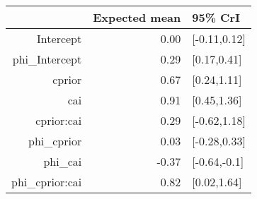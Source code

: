 \begin{tabular}{rrl}
  \hline
 & Expected mean & 95\% CrI \\ 
  \hline
Intercept & 0.00 & [-0.11,0.12] \\ 
  phi\_Intercept & 0.29 & [0.17,0.41] \\ 
  cprior & 0.67 & [0.24,1.11] \\ 
  cai & 0.91 & [0.45,1.36] \\ 
  cprior:cai & 0.29 & [-0.62,1.18] \\ 
  phi\_cprior & 0.03 & [-0.28,0.33] \\ 
  phi\_cai & -0.37 & [-0.64,-0.1] \\ 
  phi\_cprior:cai & 0.82 & [0.02,1.64] \\ 
   \hline
\end{tabular}

